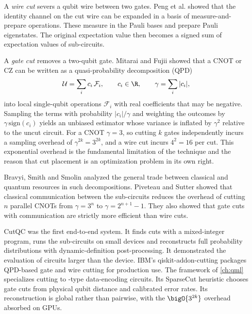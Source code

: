 A \emph{wire cut} severs a qubit wire between two gates. Peng et al. \cite{peng2020circuitcutting} showed that the identity channel on the cut wire can be expanded in a basis of measure-and-prepare operations. These measure in the Pauli bases and prepare Pauli eigenstates. The original expectation value then becomes a signed sum of expectation values of sub-circuits.

A \emph{gate cut} removes a two-qubit gate. Mitarai and Fujii \cite{mitarai2021virtualgate} showed that a CNOT or CZ can be written as a quasi-probability decomposition (QPD)
\begin{equation}\label{eq:bg:qpd}
\mathcal{U}=\sum_{i}c_i\,\mathcal{F}_i,\qquad c_i\in\R,\qquad \gamma=\sum_{i}|c_i|,
\end{equation}
into local single-qubit operations $\mathcal{F}_i$ with real coefficients that may be negative. Sampling the terms with probability $|c_i|/\gamma$ and weighting the outcomes by $\gamma\,\mathrm{sign}(c_i)$ yields an unbiased estimator whose variance is inflated by $\gamma^2$ relative to the uncut circuit. For a CNOT $\gamma=3$, so cutting $k$ gates independently incurs a sampling overhead of $\gamma^{2k}=3^{2k}$, and a wire cut incurs $4^2=16$ per cut. This exponential overhead is the fundamental limitation of the technique and the reason that cut placement is an optimization problem in its own right.

Bravyi, Smith and Smolin \cite{bravyi2016trading} analyzed the general trade between classical and quantum resources in such decompositions. Piveteau and Sutter \cite{piveteau2024knitting} showed that classical communication between the sub-circuits reduces the overhead of cutting $n$ parallel CNOTs from $\gamma=3^{n}$ to $\gamma=2^{n+1}-1$. They also showed that gate cuts with communication are strictly more efficient than wire cuts.

CutQC \cite{tang2021cutqc} was the first end-to-end system. It finds cuts with a mixed-integer program, runs the sub-circuits on small devices and reconstructs full probability distributions with dynamic-definition post-processing. It demonstrated the evaluation of circuits larger than the device. IBM's qiskit-addon-cutting packages QPD-based gate and wire cutting for production use. The \shardq{} framework of \cref{ch:qml} \cite{guo2025shardq} specializes cutting to \qcrank{}-type data-encoding circuits. Its SparseCut heuristic chooses gate cuts from physical qubit distance and calibrated error rates. Its reconstruction is global rather than pairwise, with the $\bigO{3^{2k}}$ overhead absorbed on GPUs.

